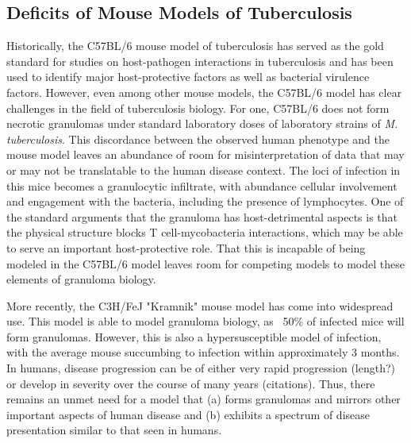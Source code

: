 \subsection{Deficits of Mouse Models of Tuberculosis}

Historically, the C57BL/6 mouse model of tuberculosis has served as the gold standard for studies on host-pathogen interactions in tuberculosis and has been used to identify major host-protective factors as well as bacterial virulence factors. However, even among other mouse models, the C57BL/6 model has clear challenges in the field of tuberculosis biology. For one, C57BL/6 does not form necrotic granulomas under standard laboratory doses of laboratory strains of \textit{M. tuberculosis}. This discordance between the observed human phenotype and the mouse model leaves an abundance of room for misinterpretation of data that may or may not be translatable to the human disease context. The loci of infection in this mice becomes a granulocytic infiltrate, with abundance cellular involvement and engagement with the bacteria, including the presence of lymphocytes. One of the standard arguments that the granuloma has host-detrimental aspects is that the physical structure blocks T cell-mycobacteria interactions, which may be able to serve an important host-protective role. That this is incapable of being modeled in the C57BL/6 model leaves room for competing models to model these elements of granuloma biology.

More recently, the C3H/FeJ "Kramnik" mouse model has come into widespread use. This model is able to model granuloma biology, as ~50\% of infected mice will form granulomas. However, this is also a hypersusceptible model of infection, with the average mouse succumbing to infection within approximately 3 months. In humans, disease progression can be of either very rapid progression (length?) or develop in severity over the course of many years (citations). Thus, there remains an unmet need for a model that (a) forms granulomas and mirrors other important aspects of human disease and (b) exhibits a spectrum of disease presentation similar to that seen in humans. 

